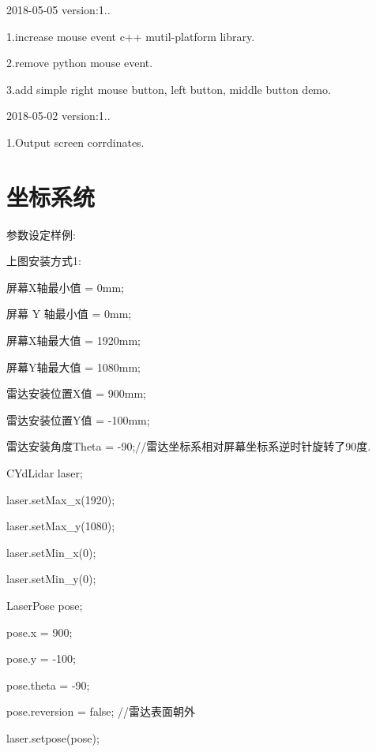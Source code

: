 2018-\/05-\/05 version\+:1..

1.\+increase mouse event c++ mutil-\/platform library.

2.\+remove python mouse event.

3.\+add simple right mouse button, left button, middle button demo.

2018-\/05-\/02 version\+:1..

1.\+Output screen corrdinates.

\section*{坐标系统 }

\href{https://github.com/yangfuyuan
    }{\tt } 

参数设定样例\+:

上图安装方式1\+: \begin{DoxyVerb}屏幕X轴最小值 = 0mm;

屏幕 Y 轴最小值 = 0mm;

屏幕X轴最大值 = 1920mm;

屏幕Y轴最大值 = 1080mm;

雷达安装位置X值 = 900mm;

雷达安装位置Y值 = -100mm;

雷达安装角度Theta = -90;//雷达坐标系相对屏幕坐标系逆时针旋转了90度.

CYdLidar laser;

laser.setMax_x(1920);

laser.setMax_y(1080);

laser.setMin_x(0);

laser.setMin_y(0);

LaserPose pose;

pose.x = 900;

pose.y = -100;

pose.theta = -90;

pose.reversion = false; //雷达表面朝外

laser.setpose(pose);
\end{DoxyVerb}



